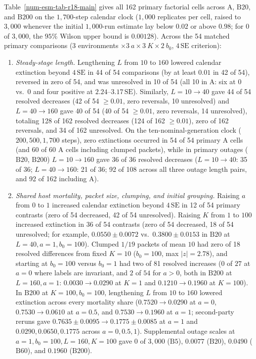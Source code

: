 Table~\ref{num-esm-tab-r18-main} gives all 162 primary factorial cells across $\mathrm{A}$, $\mathrm{B20}$, and $\mathrm{B200}$ on the $1{,}700$-step calendar clock ($1{,}000$ replicates per cell, raised to $3{,}000$ whenever the initial $1{,}000$-run estimate lay below $0.02$ or above $0.98$; for $0$ of $3{,}000$, the $95\%$ Wilson upper bound is $0.00128$). Across the 54 matched primary comparisons ($3$ environments $\times 3\ a \times 3\ K \times 2\ b_0$, $4\,\mathrm{SE}$ criterion):
\begin{enumerate}
\item \emph{Steady-stage length.} Lengthening $L$ from $10$ to $160$ lowered calendar extinction beyond $4\,\mathrm{SE}$ in 44 of 54 comparisons (by at least $0.01$ in 42 of 54), reversed in zero of 54, and was unresolved in 10 of 54 (all 10 in $\mathrm{A}$: six at $0$ vs.\ $0$ and four positive at $2.24$--$3.17\,\mathrm{SE}$). Similarly, $L = 10 \to 40$ gave 44 of 54 resolved decreases (42 of 54 $\ge 0.01$, zero reversals, 10 unresolved) and $L = 40 \to 160$ gave 40 of 54 (40 of 54 $\ge 0.01$, zero reversals, 14 unresolved), totaling 128 of 162 resolved decreases (124 of 162 $\ge 0.01$), zero of 162 reversals, and 34 of 162 unresolved. On the ten-nominal-generation clock ($200, 500, 1{,}700$ steps), zero extinctions occurred in 54 of 54 primary $\mathrm{A}$ cells (and 60 of 60 $\mathrm{A}$ cells including clumped packets), while in primary outages ($\mathrm{B20}$, $\mathrm{B200}$) $L = 10 \to 160$ gave 36 of 36 resolved decreases ($L = 10 \to 40$: 35 of 36; $L = 40 \to 160$: 21 of 36; 92 of 108 across all three outage length pairs, and 92 of 162 including $\mathrm{A}$).
\item \emph{Shared host mortality, packet size, clumping, and initial grouping.} Raising $a$ from $0$ to $1$ increased calendar extinction beyond $4\,\mathrm{SE}$ in 12 of 54 primary contrasts (zero of 54 decreased, 42 of 54 unresolved). Raising $K$ from $1$ to $100$ increased extinction in 36 of 54 contrasts (zero of 54 decreased, 18 of 54 unresolved; for example, $0.0550 \pm 0.0072$ vs.\ $0.3800 \pm 0.0153$ in $\mathrm{B20}$ at $L = 40, a = 1, b_0 = 100$). Clumped $1/19$ packets of mean $10$ had zero of 18 resolved differences from fixed $K = 10$ ($b_0 = 100$, max $|z| = 2.78$), and starting at $b_0 = 100$ versus $b_0 = 1$ had two of 81 resolved increases ($0$ of $27$ at $a = 0$ where labels are invariant, and $2$ of $54$ for $a > 0$, both in $\mathrm{B200}$ at $L = 160, a = 1$: $0.0030 \to 0.0290$ at $K = 1$ and $0.1210 \to 0.1960$ at $K = 100$). In $\mathrm{B200}$ at $K = 100, b_0 = 100$, lengthening $L$ from $10$ to $160$ lowered extinction across every mortality share ($0.7520 \to 0.0290$ at $a = 0$, $0.7530 \to 0.0610$ at $a = 0.5$, and $0.7530 \to 0.1960$ at $a = 1$; second-party reruns gave $0.7635 \pm 0.0095 \to 0.1775 \pm 0.0085$ at $a = 1$ and $0.0290, 0.0650, 0.1775$ across $a = 0, 0.5, 1$). Supplemental outage scales at $a = 1, b_0 = 100, L = 160, K = 100$ gave $0$ of $3{,}000$ ($\mathrm{B5}$), $0.0077$ ($\mathrm{B20}$), $0.0490$ ($\mathrm{B60}$), and $0.1960$ ($\mathrm{B200}$).

\end{enumerate}
